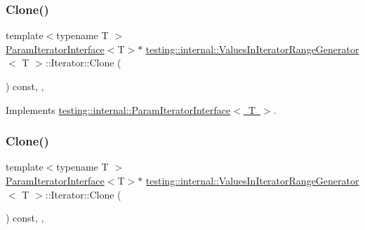 \subsubsection{\texorpdfstring{Clone()}{Clone()}\hspace{0.1cm}{\footnotesize\ttfamily [2/3]}}
{\footnotesize\ttfamily template$<$typename T $>$ \\
\mbox{\hyperlink{classtesting_1_1internal_1_1_param_iterator_interface}{Param\+Iterator\+Interface}}$<$T$>$$\ast$ \mbox{\hyperlink{classtesting_1_1internal_1_1_values_in_iterator_range_generator}{testing\+::internal\+::\+Values\+In\+Iterator\+Range\+Generator}}$<$ T $>$\+::Iterator\+::\+Clone (\begin{DoxyParamCaption}{ }\end{DoxyParamCaption}) const\hspace{0.3cm}{\ttfamily [inline]}, {\ttfamily [override]}, {\ttfamily [virtual]}}



Implements \mbox{\hyperlink{classtesting_1_1internal_1_1_param_iterator_interface_a4998c23e27e2943d97546011aa35db80}{testing\+::internal\+::\+Param\+Iterator\+Interface$<$ T $>$}}.

\mbox{\label{classtesting_1_1internal_1_1_values_in_iterator_range_generator_1_1_iterator_a2c5ccf4da12cfb089829438d679ae35e}} 
\subsubsection{\texorpdfstring{Clone()}{Clone()}\hspace{0.1cm}{\footnotesize\ttfamily [3/3]}}
{\footnotesize\ttfamily template$<$typename T $>$ \\
\mbox{\hyperlink{classtesting_1_1internal_1_1_param_iterator_interface}{Param\+Iterator\+Interface}}$<$T$>$$\ast$ \mbox{\hyperlink{classtesting_1_1internal_1_1_values_in_iterator_range_generator}{testing\+::internal\+::\+Values\+In\+Iterator\+Range\+Generator}}$<$ T $>$\+::Iterator\+::\+Clone (\begin{DoxyParamCaption}{ }\end{DoxyParamCaption}) const\hspace{0.3cm}{\ttfamily [inline]}, {\ttfamily [override]}, {\ttfamily [virtual]}}




